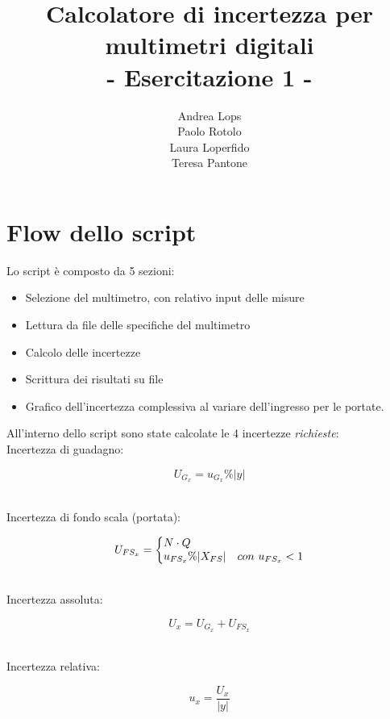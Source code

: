 \documentclass[a4paper]{article}
\title{\textbf{Calcolatore di incertezza per multimetri digitali}\\ {\normalsize - Esercitazione 1 -}}
\author{Andrea Lops\\
		Paolo Rotolo\\
		Laura Loperfido\\
		Teresa Pantone}
\date{}
\begin{document}
\maketitle
\section{Flow dello script}

Lo script è composto da 5 sezioni:\begin{itemize}
  \item Selezione del multimetro, con relativo input delle misure
  \item Lettura da file delle specifiche del multimetro
  \item Calcolo delle incertezze
  \item Scrittura dei risultati su file
  \item Grafico dell'incertezza complessiva al variare dell’ingresso per le portate.

\end{itemize}

All'interno dello script sono state calcolate le 4 incertezze \emph{richieste}:\\ 

\noindent 
Incertezza di guadagno:
\begin{Large}
	\begin{equation} U_{G_x} = u_{G_x} \%|y|  \end{equation}
\end{Large}\\
Incertezza di fondo scala (portata):
\begin{Large}
	\begin{equation}
  		U_{FS_x}=\left\{
    		\begin{array}{@{} l c @{}}
      			N \cdot Q  \\
      			u_{FS_x} \%|X_{FS}| & con \ u_{FS_x}<1
    \end{array}\right.
  \label{eq4}
\end{equation}
\end{Large}\\
Incertezza assoluta:
\begin{Large}
	\begin{equation} U_x = U_{G_x} + U_{FS_x}  \end{equation}
\end{Large}\\
Incertezza relativa:
\begin{Large}
	\begin{equation} u_x = \frac {U_x} {|y|}  \end{equation}
\end{Large}
\end{document}
